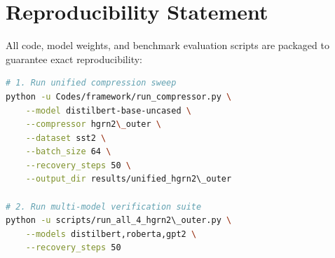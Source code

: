 \section{Reproducibility Statement}
All code, model weights, and benchmark evaluation scripts are packaged to guarantee exact reproducibility:
\begin{lstlisting}[language=bash]
# 1. Run unified compression sweep
python -u Codes/framework/run_compressor.py \
    --model distilbert-base-uncased \
    --compressor hgrn2\_outer \
    --dataset sst2 \
    --batch_size 64 \
    --recovery_steps 50 \
    --output_dir results/unified_hgrn2\_outer

# 2. Run multi-model verification suite
python -u scripts/run_all_4_hgrn2\_outer.py \
    --models distilbert,roberta,gpt2 \
    --recovery_steps 50
\end{lstlisting}
